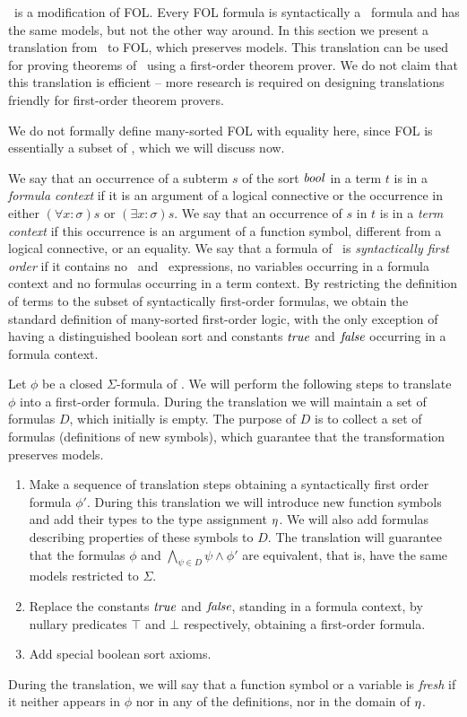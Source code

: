 \folb\ is a modification of FOL. Every FOL formula is syntactically a \folb\ formula and has the same models, but not the other way around. In this section we present a translation from \folb\ to FOL, which preserves models. This translation can be used for proving theorems of \folb\ using a first-order theorem prover. We do not claim that this translation is efficient -- more research is required on designing translations friendly for first-order theorem provers.

We do not formally define many-sorted FOL with equality here, since FOL is essentially a subset of \folb, which we will discuss now.  

We say that an occurrence of a subterm $s$ of the sort $\mathit{bool}$ in a term $t$ is in a \emph{formula context} if it is an argument of a logical connective or the occurrence in either $(\forall x:\sigma)s$ or $(\exists x:\sigma)s$. We say that an occurrence of $s$ in $t$ is in a \emph{term context} if this occurrence is an argument of a function symbol, different from a logical connective, or an equality. We say that a formula of \folb\ is \emph{syntactically first order} if it contains no \ITE\ and \LETIN\ expressions, no variables occurring in a formula context and no formulas occurring in a term context. By restricting the definition of terms to the subset of syntactically first-order formulas, we obtain the standard definition of many-sorted first-order logic, with the only exception of having a distinguished boolean sort and constants $\mathit{true}$ and $\mathit{false}$ occurring in a formula context.

Let $\phi$ be a closed $\Sigma$-formula of \folb{}. We will perform the following steps to translate $\phi$ into a first-order formula. During the translation we will maintain a set of formulas $D$, which initially is empty. The purpose of $D$ is to collect a set of formulas (definitions of new symbols), which guarantee that the transformation preserves models.

\begin{enumerate}
\item Make a sequence of translation steps obtaining a syntactically first order formula $\phi'$. During this translation we will introduce new function symbols and add their types to the type assignment $\eta$. We will also add formulas describing properties of these symbols to $D$. The translation will guarantee that the formulas $\phi$ and $\bigwedge_{\psi \in D}\psi \wedge \phi'$ are equivalent, that is, have the same models restricted to $\Sigma$.

\item Replace the constants $\mathit{true}$ and $\mathit{false}$, standing in a formula context, by nullary predicates $\top$ and $\bot$ respectively, obtaining a first-order formula.

\item Add special boolean sort axioms.
\end{enumerate}
During the translation, we will say that a function symbol or a variable is \emph{fresh} if it neither appears in $\phi$ nor in any of the definitions, nor in the domain of $\eta$.

